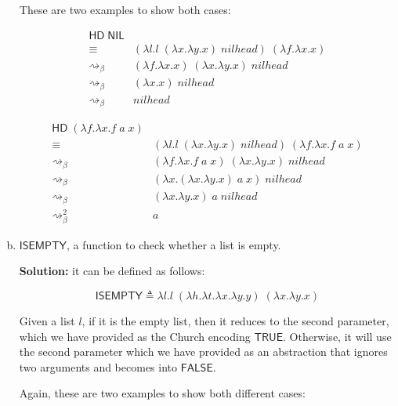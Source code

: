 \documentclass{article}
\begin{document}
\begin{enumerate}[a)]
    These are two examples to show both cases:

    \begin{align*}
      \mathsf{HD}\;\mathsf{NIL} & \\ 
        \equiv& (
          \lambda l.
            l\;(\lambda x.\lambda y.x)\;nilhead
        )\;(\lambda f.\lambda x.x) \\ 
        \rightsquigarrow_\beta&
          (\lambda f.\lambda x.x)\;
          (\lambda x.\lambda y.x)\;
          nilhead \\ 
        \rightsquigarrow_\beta&
          (\lambda x.x)\;
          nilhead \\
        \rightsquigarrow_\beta&
          nilhead
    \end{align*}

    \begin{align*}
      \mathsf{HD}\;(\lambda f.\lambda x.f\;a\;x) & \\ 
        \equiv& (
          \lambda l.
            l\;(\lambda x.\lambda y.x)\;nilhead
        )\;(\lambda f.\lambda x.f\;a\;x) \\ 
        \rightsquigarrow_\beta&
          (\lambda f.\lambda x.f\;a\;x)\;
          (\lambda x.\lambda y.x)\;
          nilhead \\ 
        \rightsquigarrow_\beta&
          (\lambda x.(\lambda x.\lambda y.x)\;a\;x)\;
          nilhead \\ 
        \rightsquigarrow_\beta&
          (\lambda x.\lambda y.x)\;a\;nilhead\\ 
        \rightsquigarrow_\beta^2& a
    \end{align*}

  \item $\mathsf{ISEMPTY}$, a function to check whether a 
    list is empty.

    \textbf{Solution:} it can be defined as follows:

    $$
      \mathsf{ISEMPTY} 
        \triangleq \lambda l.
          l\;
          (\lambda h.\lambda t.\lambda x.\lambda y.y)\;
          (\lambda x.\lambda y.x)
    $$

    Given a list $l$, if it is the empty list, then it reduces to 
    the second parameter, which we have provided as the Church 
    encoding $\mathsf{TRUE}$. Otherwise, it will use the second 
    parameter which we have provided as an abstraction that 
    ignores two arguments and becomes into $\mathsf{FALSE}$.

    Again, these are two examples to show both different cases:


\end{enumerate}
\end{document}
